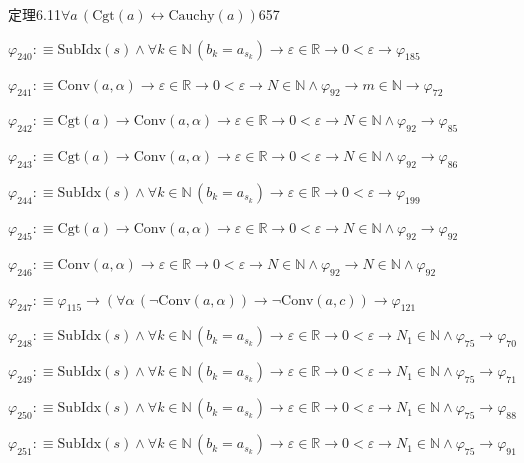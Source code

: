 \begin{fullproof}{定理6.11}{$\forall a\,(\mathrm{Cgt}(a) \leftrightarrow \mathrm{Cauchy}(a))$}{657}
\begin{abbrevlist}
\item $\varphi_{240} :\equiv \mathrm{SubIdx}(s) \land \forall k \in \mathbb{N}\,(b_{k} = a_{s_{k}}) \to \varepsilon \in \mathbb{R} \to 0 < \varepsilon \to \varphi_{185}$
\item $\varphi_{241} :\equiv \mathrm{Conv}(a,\alpha) \to \varepsilon \in \mathbb{R} \to 0 < \varepsilon \to N \in \mathbb{N} \land \varphi_{92} \to m \in \mathbb{N} \to \varphi_{72}$
\item $\varphi_{242} :\equiv \mathrm{Cgt}(a) \to \mathrm{Conv}(a,\alpha) \to \varepsilon \in \mathbb{R} \to 0 < \varepsilon \to N \in \mathbb{N} \land \varphi_{92} \to \varphi_{85}$
\item $\varphi_{243} :\equiv \mathrm{Cgt}(a) \to \mathrm{Conv}(a,\alpha) \to \varepsilon \in \mathbb{R} \to 0 < \varepsilon \to N \in \mathbb{N} \land \varphi_{92} \to \varphi_{86}$
\item $\varphi_{244} :\equiv \mathrm{SubIdx}(s) \land \forall k \in \mathbb{N}\,(b_{k} = a_{s_{k}}) \to \varepsilon \in \mathbb{R} \to 0 < \varepsilon \to \varphi_{199}$
\item $\varphi_{245} :\equiv \mathrm{Cgt}(a) \to \mathrm{Conv}(a,\alpha) \to \varepsilon \in \mathbb{R} \to 0 < \varepsilon \to N \in \mathbb{N} \land \varphi_{92} \to \varphi_{92}$
\item $\varphi_{246} :\equiv \mathrm{Conv}(a,\alpha) \to \varepsilon \in \mathbb{R} \to 0 < \varepsilon \to N \in \mathbb{N} \land \varphi_{92} \to N \in \mathbb{N} \land \varphi_{92}$
\item $\varphi_{247} :\equiv \varphi_{115} \to (\forall \alpha\,(\neg \mathrm{Conv}(a,\alpha)) \to \neg \mathrm{Conv}(a,c)) \to \varphi_{121}$
\item $\varphi_{248} :\equiv \mathrm{SubIdx}(s) \land \forall k \in \mathbb{N}\,(b_{k} = a_{s_{k}}) \to \varepsilon \in \mathbb{R} \to 0 < \varepsilon \to N_{1} \in \mathbb{N} \land \varphi_{75} \to \varphi_{70}$
\item $\varphi_{249} :\equiv \mathrm{SubIdx}(s) \land \forall k \in \mathbb{N}\,(b_{k} = a_{s_{k}}) \to \varepsilon \in \mathbb{R} \to 0 < \varepsilon \to N_{1} \in \mathbb{N} \land \varphi_{75} \to \varphi_{71}$
\item $\varphi_{250} :\equiv \mathrm{SubIdx}(s) \land \forall k \in \mathbb{N}\,(b_{k} = a_{s_{k}}) \to \varepsilon \in \mathbb{R} \to 0 < \varepsilon \to N_{1} \in \mathbb{N} \land \varphi_{75} \to \varphi_{88}$
\item $\varphi_{251} :\equiv \mathrm{SubIdx}(s) \land \forall k \in \mathbb{N}\,(b_{k} = a_{s_{k}}) \to \varepsilon \in \mathbb{R} \to 0 < \varepsilon \to N_{1} \in \mathbb{N} \land \varphi_{75} \to \varphi_{91}$

\end{abbrevlist}
\end{fullproof}
